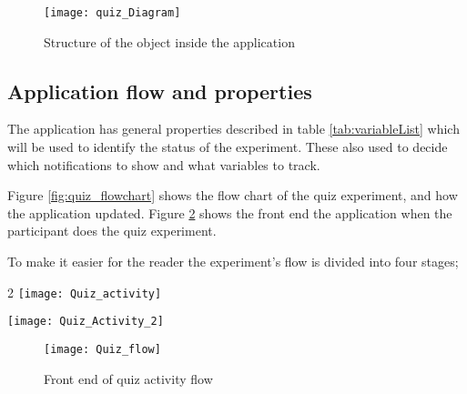 \begin{figure}[!b]
\begin{center}
\texttt{[image: quiz\_Diagram]}
\end{center}
\centering
\captionsetup{justification=centering}
\caption{Structure of the object inside the application}
\label{fig:Experiment_objects}
\end{figure}


\subsection{Application flow and properties}

The application has general properties described in table \ref{tab:variableList} which will be used to identify the status of the experiment.
These  also used to decide which notifications to show and what variables to track.

Figure \ref{fig:quiz_flowchart} shows the flow chart of the quiz experiment, and how the application  updated.
Figure \ref{fig:quiz_flow} shows the front end the application when the participant does the quiz experiment.

To make it easier for the reader the experiment's flow is divided into four stages;
\begin{figure*}[!b]
\begin{multicols}{2}
    \texttt{[image: Quiz\_activity]}\par
    \texttt{[image: Quiz\_Activity\_2]}\par
    \end{multicols}
\centering
\captionsetup{justification=centering}
\caption{Quiz flowchart}
\label{fig:quiz_flowchart}
\end{figure*}


\begin{figure}[!t]
\begin{center}
\texttt{[image: Quiz\_flow]}
\end{center}
\centering
\captionsetup{justification=centering}
\caption{Front end of quiz activity flow}
\label{fig:quiz_flow}
\end{figure}

